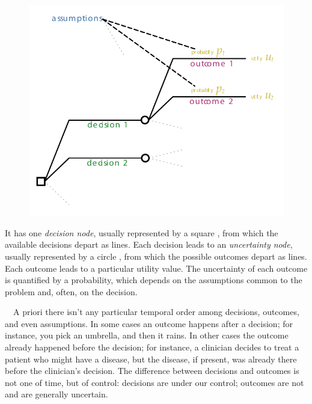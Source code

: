 \documentclass[
  a4paper,
  DIV=11,
  numbers=noendperiod,
  oneside]{scrreprt}
\begin{document}
\begin{figure}

{\centering \includegraphics[width=1\textwidth,height=\textheight]{index_files/mediabag/decision_tree.pdf}

}

\end{figure}

It has one \emph{decision node}, usually represented by a square
, from which the available decisions depart as lines.
Each decision leads to an \emph{uncertainty node}, usually represented
by a circle , from which the possible outcomes depart as
lines. Each outcome leads to a particular utility value. The uncertainty
of each outcome is quantified by a probability, which depends on the
assumptions common to the problem and, often, on the decision.

~~A priori there isn't any particular
temporal order among decisions, outcomes, and even assumptions. In some
cases an outcome happens after a decision; for instance, you pick an
umbrella, and then it rains. In other cases the outcome already happened
before the decision; for instance, a clinician decides to treat a
patient who might have a disease, but the disease, if present, was
already there before the clinician's decision. The difference between
decisions and outcomes is not one of time, but of control: decisions are
under our control; outcomes are not and are generally uncertain.
\end{document}
